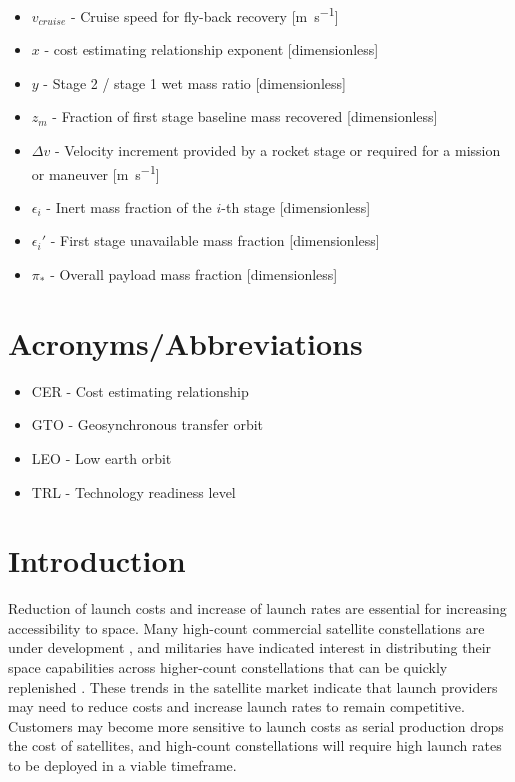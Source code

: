 \documentclass[conf]{new-aiaa}
\begin{document}
\begin{multicols}{2}
\begin{itemize}
    \item $v_{cruise}$ - Cruise speed for fly-back recovery [\si{\meter\per\second}]
    \item $x$ - cost estimating relationship exponent [dimensionless]
    \item $y$ - Stage 2 / stage 1 wet mass ratio [dimensionless]
    \item $z_m$ - Fraction of first stage baseline mass recovered [dimensionless]
    \item $\Delta v$ - Velocity increment provided by a rocket stage or required for a mission or maneuver [\si{\meter\per\second}]
    \item $\epsilon_i$ - Inert mass fraction of the $i$-th stage [dimensionless]
    \item $\epsilon_i'$ - First stage unavailable mass fraction [dimensionless]
    \item $\pi_*$ - Overall payload mass fraction [dimensionless]
\end{itemize}

\section*{Acronyms/Abbreviations}
\begin{itemize}
    \item CER - Cost estimating relationship
    \item GTO - Geosynchronous transfer orbit
    \item LEO - Low earth orbit
    \item TRL - Technology readiness level
\end{itemize}

\section{Introduction}

Reduction of launch costs and increase of launch rates are essential for increasing accessibility to space. Many high-count commercial satellite constellations are under development \cite{SIA2017, Henry2017}, and militaries have indicated interest in distributing their space capabilities across higher-count constellations that can be quickly replenished \cite{DARPA_Blackjack}. These trends in the satellite market indicate that launch providers may need to reduce costs and increase launch rates to remain competitive. Customers may become more sensitive to launch costs as serial production drops the cost of satellites, and high-count constellations will require high launch rates to be deployed in a viable timeframe.


\end{multicols}
\end{document}

